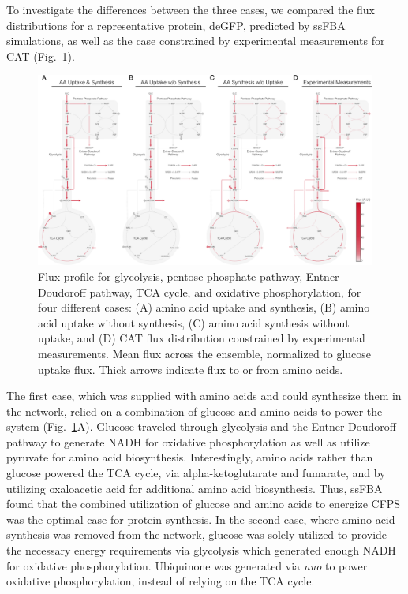\documentclass[journal=asbcd6,manuscript=article]{achemso}
\begin{document}
To investigate the differences between the three cases, we compared the flux distributions for a representative protein, deGFP, predicted by ssFBA simulations, as well as the case constrained by experimental measurements for CAT (Fig.~\ref{fig:flux}).
\begin{figure}[t!]
\includegraphics[width=1.00\textwidth]{./Figures/Flux_all.pdf}
\caption{Flux profile for glycolysis, pentose phosphate pathway, Entner-Doudoroff pathway, TCA cycle, and oxidative phosphorylation, for four different cases: (A) amino acid uptake and synthesis, (B) amino acid uptake without synthesis, (C) amino acid synthesis without uptake, and (D) CAT flux distribution constrained by experimental measurements. Mean flux across the ensemble, normalized to glucose uptake flux. Thick arrows indicate flux to or from amino acids.}
\label{fig:flux}
\end{figure}
The first case, which was supplied with amino acids and could synthesize them in the network, relied on a combination of glucose and amino acids to power the system (Fig.~\ref{fig:flux}A).
Glucose traveled through glycolysis and the Entner-Doudoroff pathway to generate NADH for oxidative phosphorylation as well as utilize pyruvate for amino acid biosynthesis.
Interestingly, amino acids rather than glucose powered the TCA cycle, via alpha-ketoglutarate and fumarate, and by utilizing oxaloacetic acid for additional amino acid biosynthesis.
Thus, ssFBA found that the combined utilization of glucose and amino acids to energize CFPS was the optimal case for protein synthesis.
In the second case, where amino acid synthesis was removed from the network, glucose was solely utilized to provide the necessary energy requirements via glycolysis which generated enough NADH for oxidative phosphorylation.
Ubiquinone was generated via \textit{nuo} to power oxidative phosphorylation, instead of relying on the TCA cycle.
\end{document}

